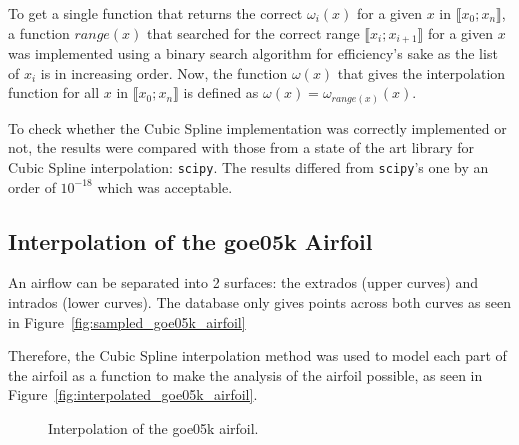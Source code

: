 To get a single function that returns the correct $\omega_i(x)$ for a given $x$ in $\llbracket x_0; x_n \rrbracket$, a function $range(x)$ that searched for the correct range $\llbracket x_i;x_{i+1} \rrbracket$ for a given $x$ was implemented using a binary search algorithm for efficiency's sake as the list of $x_i$ is in increasing order.
Now, the function $\omega(x)$ that gives the interpolation function for all $x$ in $\llbracket x_0;x_n \rrbracket$ is defined as $\omega(x) = \omega_{range(x)}(x)$.

To check whether the Cubic Spline implementation was correctly implemented or not, the results were compared with those from a state of the art library for Cubic Spline interpolation: \verb|scipy|.
The results differed from \verb|scipy|'s one by an order of $10^{-18}$ which was acceptable.

\subsection{Interpolation of the goe05k Airfoil}
An airflow can be separated into 2 surfaces: the extrados (upper curves) and intrados (lower curves).
The database only gives points across both curves as seen in Figure~\ref{fig:sampled_goe05k_airfoil}

Therefore, the Cubic Spline interpolation method was used to model each part of the airfoil as a function to make the analysis of the airfoil possible, as seen in Figure~\ref{fig:interpolated_goe05k_airfoil}.

\begin{figure}[H]
	\centering
	\qquad
	\caption{Interpolation of the goe05k airfoil.}
\end{figure}

\vspace*{-0.7cm}
